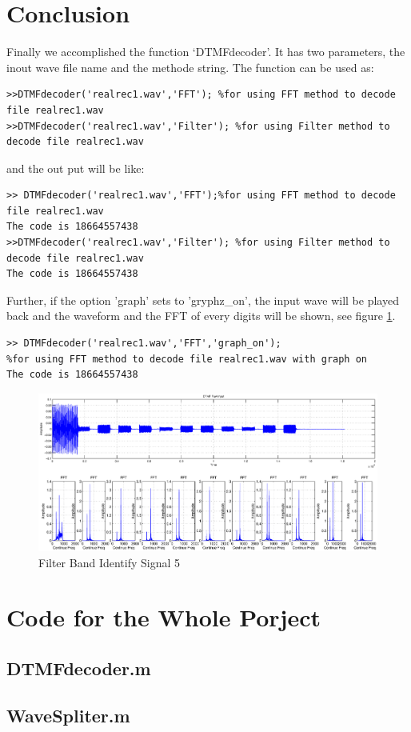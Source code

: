 \documentclass[journal]{./sty/IEEEtran}
\let\MYoriglatexcaption\caption
\renewcommand{\caption}[2][\relax]{\MYoriglatexcaption[#2]{#2}}
\begin{document}
\section{Conclusion}
Finally we accomplished the function `DTMFdecoder'. It has two parameters, the inout wave file name and the methode string. The function can be used as:\\
\begin{lstlisting}
>>DTMFdecoder('realrec1.wav','FFT'); %for using FFT method to decode file realrec1.wav
>>DTMFdecoder('realrec1.wav','Filter'); %for using Filter method to decode file realrec1.wav
\end{lstlisting}
and the out put will be like:
\begin{lstlisting}
>> DTMFdecoder('realrec1.wav','FFT');%for using FFT method to decode file realrec1.wav
The code is 18664557438
>>DTMFdecoder('realrec1.wav','Filter'); %for using Filter method to decode file realrec1.wav
The code is 18664557438
\end{lstlisting}
Further, if the option 'graph' sets to 'gryphz\_on', the input wave will be played back and the waveform and the FFT of every digits will be shown, see figure \ref{fig:out}.
\begin{lstlisting}
>> DTMFdecoder('realrec1.wav','FFT','graph_on');
%for using FFT method to decode file realrec1.wav with graph on
The code is 18664557438
\end{lstlisting}
 \begin{figure}[!t]
\centering
\includegraphics[width=0.5 \textwidth]{./pic/out.eps}
\caption{Filter Band Identify Signal 5}\label{fig:out}
\end{figure}

\appendices
\section{Code for the Whole Porject}
\subsection{DTMFdecoder.m}

\subsection{WaveSpliter.m}

\end{document}
